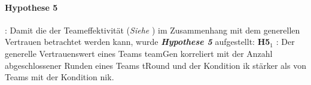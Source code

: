 \documentclass[a4paper,11pt]{article}%
\renewcommand{\\}{\vspace*{0.5\baselineskip} \newline}
\begin{document}
\paragraph{Hypothese 5}:
Damit die der Teameffektivität (\textit{Siehe }) im Zusammenhang mit dem generellen Vertrauen betrachtet werden kann, wurde \textbf{\textit{Hypothese 5}} aufgestellt:\\
\textbf{H5$_{1}$} : Der generelle Vertrauenswert eines Teams \ac{teamGen} korreliert mit der Anzahl abgeschlossener Runden eines Teams \ac{tRound} und der Kondition \ac{ik} stärker als von Teams mit der Kondition \ac{nik}. \\
%
%
%


\end{document}
